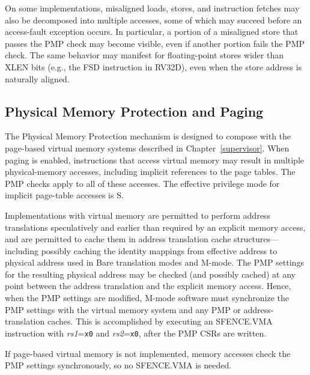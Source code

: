 On some implementations, misaligned loads, stores, and instruction fetches may
also be decomposed into multiple accesses, some of which may succeed before an
access-fault exception occurs.  In particular, a portion of a misaligned store
that passes the PMP check may become visible, even if another portion fails
the PMP check.  The same behavior may manifest for floating-point stores wider
than XLEN bits (e.g., the FSD instruction in RV32D), even when the store
address is naturally aligned.

\subsection{Physical Memory Protection and Paging}
\label{pmp-vmem}

The Physical Memory Protection mechanism is designed to compose with the
page-based virtual memory systems described in Chapter~\ref{supervisor}.  When
paging is enabled, instructions that access virtual memory may result in
multiple physical-memory accesses, including implicit references to the page
tables.  The PMP checks apply to all of these accesses.  The effective
privilege mode for implicit page-table accesses is S.

Implementations with virtual memory are permitted to perform address
translations speculatively and earlier than required by an explicit memory
access, and are permitted to cache them in address translation cache
structures---including possibly caching the identity mappings from effective
address to physical address used in Bare translation modes and M-mode.  The
PMP settings for the resulting physical address may be checked (and possibly
cached) at any point between the address translation and the explicit memory
access.
Hence, when the PMP settings are modified, M-mode software must
synchronize the PMP settings with the virtual memory system and
any PMP or address-translation caches.
This is
accomplished by executing an SFENCE.VMA instruction with {\em rs1}={\tt x0}
and {\em rs2}={\tt x0}, after the PMP CSRs are written.

If page-based virtual memory is not implemented,
memory accesses check the PMP settings synchronously, so no SFENCE.VMA is needed.
